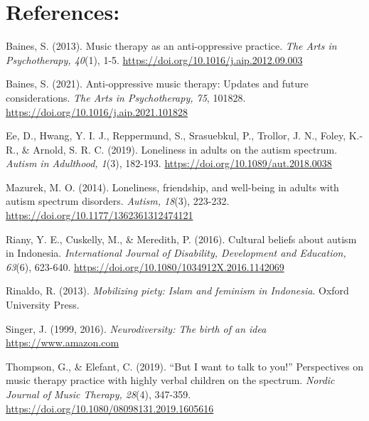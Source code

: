\documentclass[authordate, empirical]{jote-new-article}
\begin{document}
	\section{References:}



	Baines, S. (2013). Music therapy as an anti-oppressive practice. \emph{The Arts in Psychotherapy, 40}(1), 1-5. \href{https://doi.org/10.1016/j.aip.2012.09.003}{https://doi.org/10.1016/j.aip.2012.09.003}







	Baines, S. (2021). Anti-oppressive music therapy: Updates and future considerations. \emph{The Arts in Psychotherapy, 75}, 101828. \href{https://doi.org/10.1016/j.aip.2021.101828}{https://doi.org/10.1016/j.aip.2021.101828}







	Ee, D., Hwang, Y. I. J., Reppermund, S., Srasuebkul, P., Trollor, J. N., Foley, K.-R., \& Arnold, S. R. C. (2019). Loneliness in adults on the autism spectrum. \emph{Autism in Adulthood, 1}(3), 182-193. \href{https://doi.org/10.1089/aut.2018.0038}{https://doi.org/10.1089/aut.2018.0038}







	Mazurek, M. O. (2014). Loneliness, friendship, and well-being in adults with autism spectrum disorders. \emph{Autism, 18}(3), 223-232. \href{https://doi.org/10.1177/1362361312474121}{https://doi.org/10.1177/1362361312474121}







	Riany, Y. E., Cuskelly, M., \& Meredith, P. (2016). Cultural beliefs about autism in Indonesia. \emph{International Journal of Disability, Development and Education, 63}(6), 623-640. \href{https://doi.org/10.1080/1034912X.2016.1142069}{https://doi.org/10.1080/1034912X.2016.1142069}







	Rinaldo, R. (2013). \emph{Mobilizing piety: Islam and feminism in Indonesia}. Oxford University Press.







	Singer, J. (1999, 2016). \emph{Neurodiversity: The birth of an idea} \href{https://www.amazon.com}{https://www.amazon.com}







	Thompson, G., \& Elefant, C. (2019). “But I want to talk to you!” Perspectives on music therapy practice with highly verbal children on the spectrum. \emph{Nordic Journal of Music Therapy, 28}(4), 347-359. \href{https://doi.org/10.1080/08098131.2019.1605616}{https://doi.org/10.1080/08098131.2019.1605616}
\end{document}
